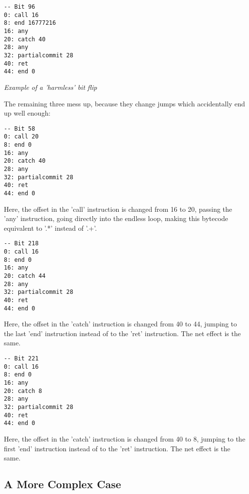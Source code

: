 \begin{myquote}
\begin{verbatim}
-- Bit 96
0: call 16
8: end 16777216
16: any
20: catch 40
28: any
32: partialcommit 28
40: ret
44: end 0

\end{verbatim}
\end{myquote}
\textit{Example of a 'harmless' bit flip}

The remaining three mess up, because they change jumps which accidentally
end up well enough:

\begin{myquote}
\begin{verbatim}
-- Bit 58
0: call 20
8: end 0
16: any
20: catch 40
28: any
32: partialcommit 28
40: ret
44: end 0

\end{verbatim}
\end{myquote}

Here, the offset in the 'call' instruction is changed from 16 to 20, passing
the 'any' instruction, going directly into the endless loop, making this
bytecode equivalent to '.*' instead of '.+'.

\begin{myquote}
\begin{verbatim}
-- Bit 218
0: call 16
8: end 0
16: any
20: catch 44
28: any
32: partialcommit 28
40: ret
44: end 0

\end{verbatim}
\end{myquote}

Here, the offset in the 'catch' instruction is changed from 40 to 44,
jumping to the last 'end' instruction instead of to the 'ret' instruction.
The net effect is the same.

\begin{myquote}
\begin{verbatim}
-- Bit 221
0: call 16
8: end 0
16: any
20: catch 8
28: any
32: partialcommit 28
40: ret
44: end 0

\end{verbatim}
\end{myquote}

Here, the offset in the 'catch' instruction is changed from 40 to 8,
jumping to the first 'end' instruction instead of to the 'ret' instruction.
The net effect is the same.

\subsection{A More Complex Case}

